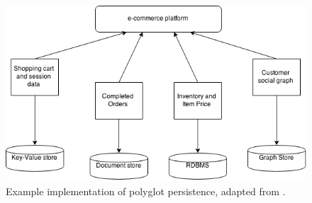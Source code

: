 \begin{figure}[h!]
\centering
\includegraphics[scale=0.5]{figure/Polyglot.png}
\caption{Example implementation of polyglot persistence, adapted from \cite{NoSQLDistilled}.}
\label{fig:polyglot}
\end{figure}

